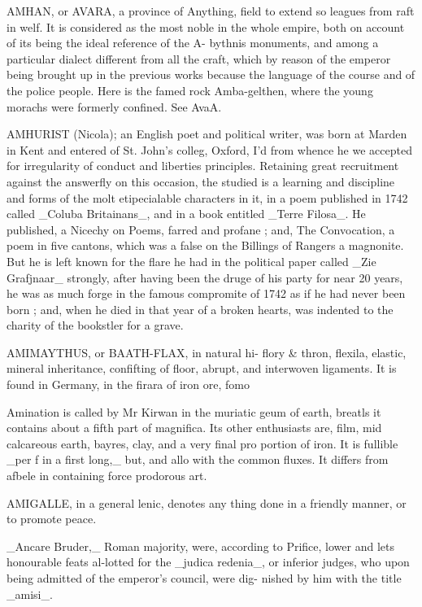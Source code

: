 AMHAN, or AVARA, a province of Anything, field to extend so leagues from raft in welf. It is considered as the most noble in the whole empire, both on account of its being the ideal reference of the A- bythnis monuments, and among a particular dialect different from all the craft, which by reason of the emperor being brought up in the previous works because the language of the course and of the police people. Here is the famed rock Amba-gelthen, where the young morachs were formerly confined. See AvaA.\par\medskip
AMHURIST (Nicola); an English poet and political writer, was born at Marden in Kent and entered of St. John's colleg, Oxford, I’d from whence he we accepted for irregularity of conduct and liberties principles. Retaining great recruitment against the answerfly on this occasion, the studied is a learning and discipline and forms of the molt etipecialable characters in it, in a poem published in 1742 called \_Coluba Britainans\_, and in a book entitled \_Terre Filosa\_. He published, a Nicechy on Poems, farred and profane ; and, The Convocation, a poem in five cantons, which was a false on the Billings of Rangers a magnonite. But he is left known for the flare he had in the political paper called \_Zie Grafjnaar\_ strongly, after having been the druge of his party for near 20 years, he was as much forge in the famous compromite of 1742 as if he had never been born ; and, when he died in that year of a broken hearts, was indented to the charity of the bookstler for a grave.\par\medskip
AMIMAYTHUS, or BAATH-FLAX, in natural hi- flory \& thron, flexila, elastic, mineral inheritance, confifting of floor, abrupt, and interwoven ligaments. It is found in Germany, in the firara of iron ore, fomo\par\medskip
Amination is called by Mr Kirwan in the muriatic geum of earth, breatls it contains about a fifth part of magnifica. Its other enthusiasts are, film, mid calcareous earth, bayres, clay, and a very final pro portion of iron. It is fullible \_per f in a first long,\_ but, and allo with the common fluxes. It differs from afbele in containing force prodorous art.\par\medskip
AMIGALLE, in a general lenic, denotes any thing done in a friendly manner, or to promote peace.\par\medskip
\_Ancare Bruder,\_ Roman majority, were, according to Prifice, lower and lets honourable feats al-lotted for the \_judica redenia\_, or inferior judges, who upon being admitted of the emperor's council, were dig- nished by him with the title \_amisi\_.\par\medskip
